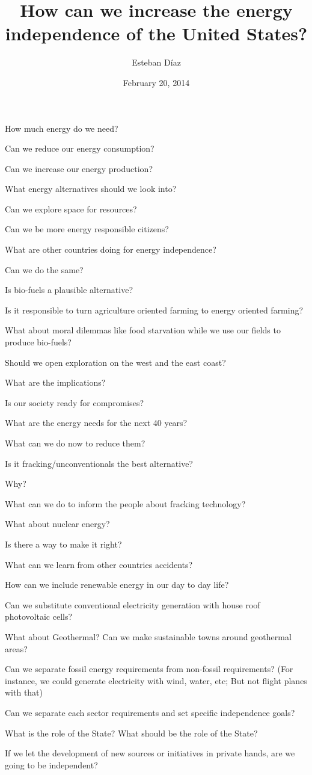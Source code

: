 \documentclass[10pt]{article}
\author{Esteban D\'{i}az}
\title{How can we increase the energy independence of the United States?}{}
\begin{document}
\date{February 20, 2014}
\maketitle
How much energy do we need?

Can we reduce our energy consumption?

Can we increase our energy production?

What energy alternatives should we look into?

Can we explore space for resources?

Can we be more energy responsible citizens?

What are other countries doing for energy independence?

Can we do the same? 

Is bio-fuels a plausible alternative?

Is it responsible to turn agriculture oriented farming to energy
oriented farming?

What about moral dilemmas like food starvation while we use our
fields to produce bio-fuels?

Should we open exploration on the west and the east coast? 

What are the implications?

Is our society ready for compromises? 

What are the energy needs for the next 40 years?

What can we do now to reduce them?

Is it fracking/unconventionals the best alternative?

Why? 

What can we do to inform the people about fracking technology? 

What about nuclear energy? 

Is there a way to make it right? 

What can we learn from other countries accidents? 

How can we include renewable energy in our day to day life?

Can we substitute conventional electricity generation with
house roof photovoltaic cells?

What about Geothermal? Can we make sustainable towns around
geothermal areas?

Can we separate fossil energy requirements from non-fossil requirements? 
(For instance, we could generate electricity with wind, water, etc; But not
flight planes with that)

Can we separate each sector requirements and set specific independence
goals?

What is the role of the State? What should be the role of the State?

If we let the development of new sources or initiatives in private hands,
 are we going to be independent?
\end{document}
